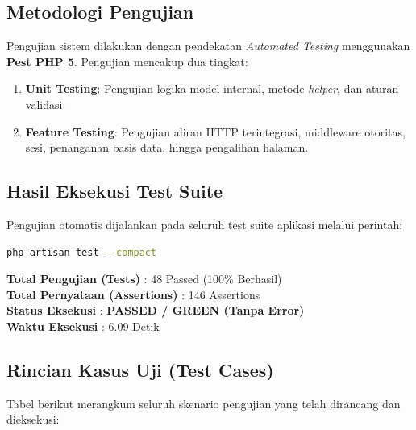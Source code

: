 \documentclass[12pt,a4paper]{article}
\begin{document}
\subsection{Metodologi Pengujian}
Pengujian sistem dilakukan dengan pendekatan \textit{Automated Testing} menggunakan \textbf{Pest PHP 5}. Pengujian mencakup dua tingkat:
\begin{enumerate}[noitemsep]
    \item \textbf{Unit Testing}: Pengujian logika model internal, metode \textit{helper}, dan aturan validasi.
    \item \textbf{Feature Testing}: Pengujian aliran HTTP terintegrasi, middleware otoritas, sesi, penanganan basis data, hingga pengalihan halaman.
\end{enumerate}

\subsection{Hasil Eksekusi Test Suite}
Pengujian otomatis dijalankan pada seluruh test suite aplikasi melalui perintah:
\begin{lstlisting}[language=bash]
php artisan test --compact
\end{lstlisting}

\begin{tcolorbox}[
    colback=nbLime!20,
    colframe=nbInk,
    boxrule=2pt,
    arc=0mm,
    title={\bfseries RINGKASAN EKSEKUSI PEST TESTING}
]
\textbf{Total Pengujian (Tests)} : 48 Passed (100\% Berhasil) \\
\textbf{Total Pernyataan (Assertions)} : 146 Assertions \\
\textbf{Status Eksekusi} : \textcolor{green!60!black}{\textbf{PASSED / GREEN (Tanpa Error)}} \\
\textbf{Waktu Eksekusi} : 6.09 Detik
\end{tcolorbox}

\subsection{Rincian Kasus Uji (Test Cases)}
Tabel berikut merangkum seluruh skenario pengujian yang telah dirancang dan dieksekusi:
\end{document}
